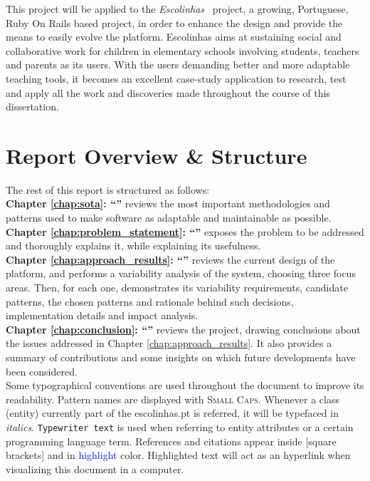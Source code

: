 This project will be applied to the \textit{Escolinhas}~\cite{escolinhas} project, a growing, Portuguese, Ruby On Rails based project, in order to enhance the design and provide the means to easily evolve the platform. Escolinhas aims at sustaining social and collaborative work for children in elementary schools involving students, teachers and parents as its users. With the users demanding better and more adaptable teaching tools, it becomes an excellent case-study application to research, test and apply all the work and discoveries made throughout the course of this dissertation.

\section{Report Overview \& Structure}\label{sec:structure}

The rest of this report is structured as follows:\\

\textbf{Chapter \ref{chap:sota}: ``'' } reviews the most important methodologies and patterns used to make software as adaptable and maintainable as possible.\\

\textbf{Chapter \ref{chap:problem_statement}: ``'' } exposes the problem to be addressed and thoroughly explains it, while explaining its usefulness.\\

\textbf{Chapter \ref{chap:approach_results}: ``'' } reviews the current design of the platform, and performs a variability analysis of the system, choosing three focus areas. Then, for each one, demonstrates its variability requirements, candidate patterns, the chosen patterns and rationale behind such decisions, implementation details and impact analysis.\\


\textbf{Chapter \ref{chap:conclusion}: ``'' } reviews the project, drawing conclusions about the issues addressed in Chapter \ref{chap:approach_results}. It also provides a summary of contributions and some insights on which future developments have been considered.\\

Some typographical conventions are used throughout the document to improve its readability. Pattern names are displayed with \textsc{Small Caps}. Whenever a class (entity) currently part of the escolinhas.pt is referred, it will be typefaced in \textit{italics}. \texttt{Typewriter text} is used when referring to entity attributes or a certain programming language term. References and citations appear inside [square brackets] and in \textcolor{blue}{highlight} color. Highlighted text will act as an hyperlink when visualizing this document in a computer.

